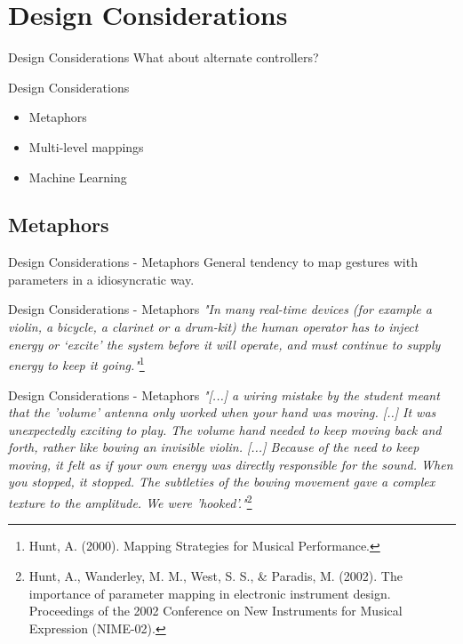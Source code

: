 \documentclass{beamer}
\begin{document}
\section{Design Considerations}

\begin{frame}{Design Considerations}
    What about alternate controllers?
\end{frame}

\begin{frame}{Design Considerations}
    \begin{itemize}
        \item Metaphors
        \item Multi-level mappings
        \item Machine Learning
    \end{itemize}
\end{frame}

\subsection{Metaphors}
\begin{frame}{Design Considerations - Metaphors}
    General tendency to map gestures with parameters in a idiosyncratic way.
\end{frame}

\begin{frame}{Design Considerations - Metaphors}
    \textit{"In many real-time devices (for example a violin, a bicycle, a clarinet or a drum-kit) the human operator has to inject energy or ‘excite’ the system before it will operate, and must continue to supply energy to keep it going."}\footnote{Hunt, A. (2000). Mapping Strategies for Musical Performance.}
\end{frame}

\begin{frame}{Design Considerations - Metaphors}
    \textit{"[...] a wiring mistake by the student meant that the 'volume' antenna only worked when your hand was moving. [..] It was unexpectedly exciting to play. The volume hand needed to keep moving back and forth, rather like bowing an invisible violin. [...] Because of the need to keep moving, it felt as if your own energy was directly responsible for the sound. When you stopped, it stopped. The subtleties of the bowing movement gave a complex texture to the amplitude. We were 'hooked'."}\footnote{Hunt, A., Wanderley, M. M., West, S. S., \& Paradis, M. (2002). The importance of parameter mapping in electronic instrument design. Proceedings of the 2002 Conference on New Instruments for Musical Expression (NIME-02).}
\end{frame}
\end{document}
